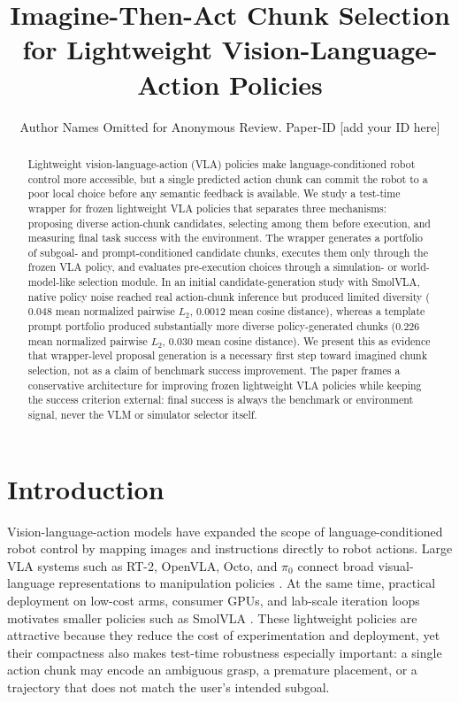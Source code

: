 \documentclass[conference]{IEEEtran}
\begin{document}
\title{Imagine-Then-Act Chunk Selection for Lightweight Vision-Language-Action Policies}

\author{Author Names Omitted for Anonymous Review. Paper-ID [add your ID here]}

\maketitle

\begin{abstract}
Lightweight vision-language-action (VLA) policies make language-conditioned
robot control more accessible, but a single predicted action chunk can commit
the robot to a poor local choice before any semantic feedback is available. We
study a test-time wrapper for frozen lightweight VLA policies that separates
three mechanisms: proposing diverse action-chunk candidates, selecting among
them before execution, and measuring final task success with the environment.
The wrapper generates a portfolio of subgoal- and prompt-conditioned candidate
chunks, executes them only through the frozen VLA policy, and evaluates
pre-execution choices through a simulation- or world-model-like selection
module. In an initial candidate-generation study with SmolVLA, native policy noise
reached real action-chunk inference but produced limited diversity
(\(0.048\) mean normalized pairwise \(L_2\), \(0.0012\) mean cosine distance),
whereas a template prompt portfolio produced substantially more diverse
policy-generated chunks (\(0.226\) mean normalized pairwise \(L_2\), \(0.030\)
mean cosine distance). We present this as evidence that wrapper-level proposal
generation is a necessary first step toward imagined chunk selection, not as a
claim of benchmark success improvement. The paper frames a conservative
architecture for improving frozen lightweight VLA policies while keeping the
success criterion external: final success is always the benchmark or
environment signal, never the VLM or simulator selector itself.
\end{abstract}

\IEEEpeerreviewmaketitle

\section{Introduction}

Vision-language-action models have expanded the scope of language-conditioned
robot control by mapping images and instructions directly to robot actions.
Large VLA systems such as RT-2, OpenVLA, Octo, and \(\pi_0\) connect broad
visual-language representations to manipulation policies
\cite{zitkovich2023rt2,kim2024openvla,octo2024,black2024pi0}. At the same
time, practical deployment on low-cost arms, consumer GPUs, and lab-scale
iteration loops motivates smaller policies such as SmolVLA
\cite{shukor2025smolvla}. These lightweight policies are attractive because
they reduce the cost of experimentation and deployment, yet their compactness
also makes test-time robustness especially important: a single action chunk may
encode an ambiguous grasp, a premature placement, or a trajectory that does not
match the user's intended subgoal.
\end{document}
